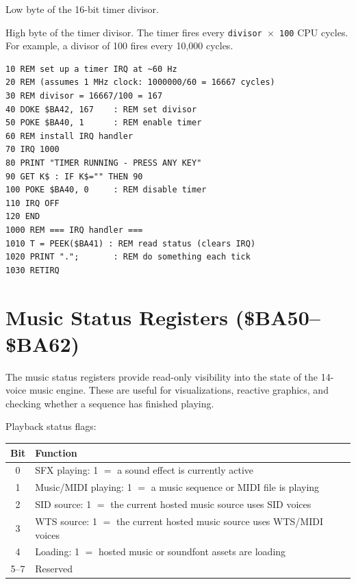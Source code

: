 Low byte of the 16-bit timer divisor.


High byte of the timer divisor.  The timer fires every
\texttt{divisor $\times$ 100} CPU cycles.  For example, a divisor of 100
fires every 10,000 cycles.

\begin{lstlisting}
10 REM set up a timer IRQ at ~60 Hz
20 REM (assumes 1 MHz clock: 1000000/60 = 16667 cycles)
30 REM divisor = 16667/100 = 167
40 DOKE $BA42, 167    : REM set divisor
50 POKE $BA40, 1      : REM enable timer
60 REM install IRQ handler
70 IRQ 1000
80 PRINT "TIMER RUNNING - PRESS ANY KEY"
90 GET K$ : IF K$="" THEN 90
100 POKE $BA40, 0     : REM disable timer
110 IRQ OFF
120 END
1000 REM === IRQ handler ===
1010 T = PEEK($BA41) : REM read status (clears IRQ)
1020 PRINT ".";       : REM do something each tick
1030 RETIRQ
\end{lstlisting}


\section{Music Status Registers (\$BA50--\$BA62)}
\label{sec:music-status}

The music status registers provide read-only visibility into the state of
the 14-voice music engine.  These are useful for visualizations, reactive
graphics, and checking whether a sequence has finished playing.



Playback status flags:


\begin{center}
\small
\begin{tabular}{@{}cl@{}}
\toprule
\textbf{Bit} & \textbf{Function} \\
\midrule
0 & SFX playing: 1 $=$ a sound effect is currently active \\
1 & Music/MIDI playing: 1 $=$ a music sequence or MIDI file is playing \\
2 & SID source: 1 $=$ the current hosted music source uses SID voices \\
3 & WTS source: 1 $=$ the current hosted music source uses WTS/MIDI voices \\
4 & Loading: 1 $=$ hosted music or soundfont assets are loading \\
5--7 & Reserved \\
\bottomrule
\end{tabular}
\end{center}


